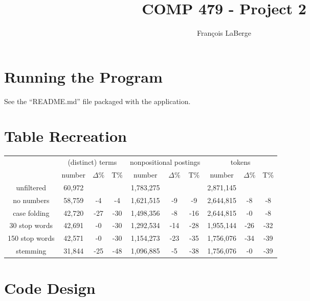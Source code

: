 \documentclass[]{article}
\title{COMP 479 - Project 2}
\author{François LaBerge}
\begin{document}
\maketitle

\section{Running the Program}
See the ``README.md'' file packaged with the application.

\section{Table Recreation}
\begin{center}
\begin{tabular}{ |c|c c c c c c c c c| } 
	\hline
	& \multicolumn{3}{c}{(distinct) terms} & \multicolumn{3}{c}{nonpositional postings} & \multicolumn{3}{c|}{tokens}\\
	& number & $\Delta\%$ & T\% & number & $\Delta\%$ & T\% & number & $\Delta\%$ & T\% \\
	\hline
	unfiltered		& 60,972 & & & 1,783,275& & & 2,871,145 & &\\
	no numbers 		& 58,759 & -4  & -4  & 1,621,515 & -9  & -9  & 2,644,815 & -8  & -8\\
	case folding	& 42,720 & -27 & -30 & 1,498,356 & -8  & -16 & 2,644,815 & -0  & -8\\
	30 stop words	& 42,691 & -0  & -30 & 1,292,534 & -14 & -28 & 1,955,144 & -26 & -32\\
	150 stop words	& 42,571 & -0  & -30 & 1,154,273 & -23 & -35 & 1,756,076 & -34 & -39\\
	stemming		& 31,844 & -25 & -48 & 1,096,885 & -5  & -38 & 1,756,076 & -0  & -39\\
	\hline
\end{tabular}
\end{center}

\section{Code Design}
\end{document}
